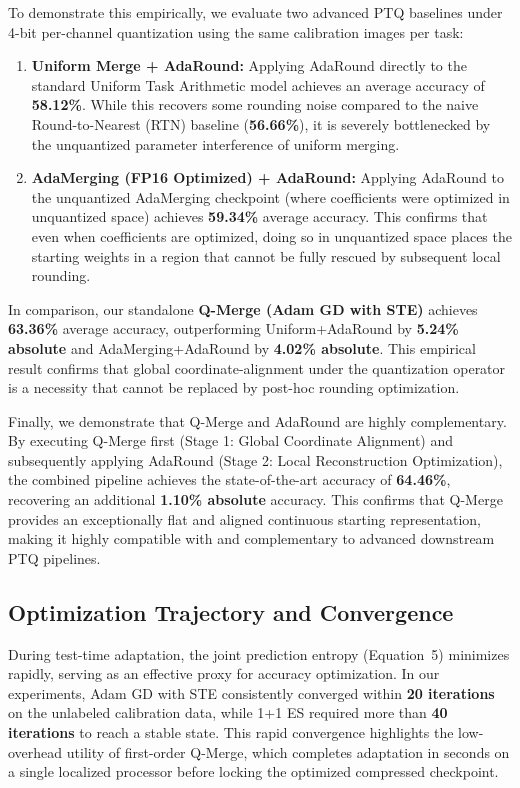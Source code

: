 To demonstrate this empirically, we evaluate two advanced PTQ baselines under 4-bit per-channel quantization using the same calibration images per task:
\begin{enumerate}
    \item \textbf{Uniform Merge + AdaRound:} Applying AdaRound directly to the standard Uniform Task Arithmetic model achieves an average accuracy of \textbf{58.12\%}. While this recovers some rounding noise compared to the naive Round-to-Nearest (RTN) baseline (\textbf{56.66\%}), it is severely bottlenecked by the unquantized parameter interference of uniform merging.
    \item \textbf{AdaMerging (FP16 Optimized) + AdaRound:} Applying AdaRound to the unquantized AdaMerging checkpoint (where coefficients were optimized in unquantized space) achieves \textbf{59.34\%} average accuracy. This confirms that even when coefficients are optimized, doing so in unquantized space places the starting weights in a region that cannot be fully rescued by subsequent local rounding.
\end{enumerate}
In comparison, our standalone \textbf{Q-Merge (Adam GD with STE)} achieves \textbf{63.36\%} average accuracy, outperforming Uniform+AdaRound by \textbf{5.24\% absolute} and AdaMerging+AdaRound by \textbf{4.02\% absolute}. This empirical result confirms that global coordinate-alignment under the quantization operator is a necessity that cannot be replaced by post-hoc rounding optimization.

Finally, we demonstrate that Q-Merge and AdaRound are highly complementary. By executing Q-Merge first (Stage 1: Global Coordinate Alignment) and subsequently applying AdaRound (Stage 2: Local Reconstruction Optimization), the combined pipeline achieves the state-of-the-art accuracy of \textbf{64.46\%}, recovering an additional \textbf{1.10\% absolute} accuracy. This confirms that Q-Merge provides an exceptionally flat and aligned continuous starting representation, making it highly compatible with and complementary to advanced downstream PTQ pipelines.

\subsection{Optimization Trajectory and Convergence}
During test-time adaptation, the joint prediction entropy (Equation~5) minimizes rapidly, serving as an effective proxy for accuracy optimization. In our experiments, Adam GD with STE consistently converged within \textbf{20 iterations} on the unlabeled calibration data, while 1+1 ES required more than \textbf{40 iterations} to reach a stable state. This rapid convergence highlights the low-overhead utility of first-order Q-Merge, which completes adaptation in seconds on a single localized processor before locking the optimized compressed checkpoint.

